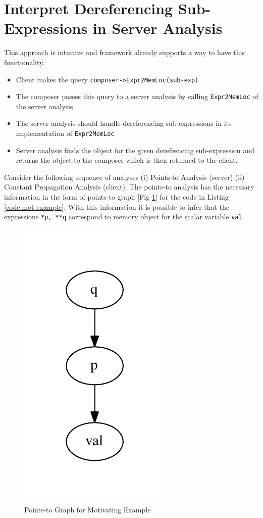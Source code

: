 \documentclass{article}
\begin{document}
\section{Interpret Dereferencing Sub-Expressions in Server Analysis}
\label{sec:interp-deref-exp-server}
This approach is intuitive and framework already supports a way to have this functionality. 
\begin{itemize}
\item Client makes the query \texttt{composer->Expr2MemLoc(sub-exp)}
\item The composer passes this query to a server analysis by calling \texttt{Expr2MemLoc} of the server analysis
\item The server analysis should handle dereferencing sub-expressions in its implementation of \texttt{Expr2MemLoc}
\item Server analysis finds the object for the given derefrencing sub-expression and returns the object to the composer which is then returned to the client.
\end{itemize}
Consider the following sequence of analyses (i) Points-to Analysis (server) (ii) Constant Propagation Analysis (client). The points-to analysis has the 
necessary information in the form of points-to graph [Fig \ref{fig:ptg-example1}] for the code in Listing \ref{code:mot-example}. With this information it is possible to infer that the expressions \texttt{*p, **q} correspond to memory object for the scalar variable \texttt{val}.
\begin{figure}[h]
\includegraphics[scale=0.5]{ptg-example1.pdf}
\caption{Points-to Graph for Motivating Example}
\label{fig:ptg-example1}
\end{figure}
\end{document}
